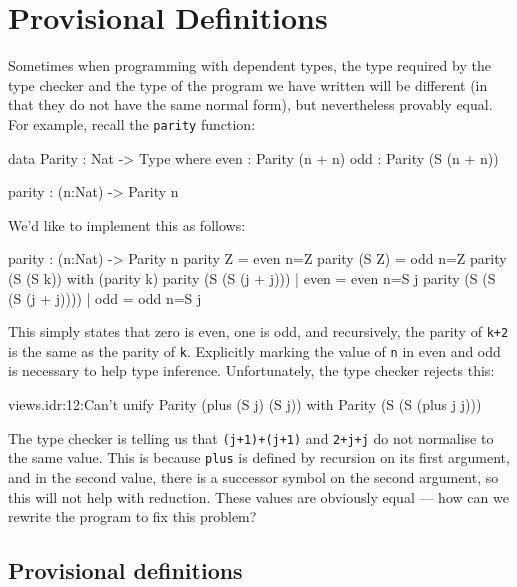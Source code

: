 \section{Provisional Definitions}

\label{sect:provisional}

Sometimes when programming with dependent types, the type required by the type checker and the type of the program we have written will be different (in that they do not have the same normal form), but nevertheless provably equal.
For example, recall the \texttt{parity} function:

\begin{code}
data Parity : Nat -> Type where
   even : Parity (n + n)
   odd  : Parity (S (n + n))

parity : (n:Nat) -> Parity n
\end{code}

\noindent
We'd like to implement this as follows:

\begin{code}
parity : (n:Nat) -> Parity n
parity Z     = even {n=Z}
parity (S Z) = odd {n=Z}
parity (S (S k)) with (parity k)
  parity (S (S (j + j)))     | even = even {n=S j}
  parity (S (S (S (j + j)))) | odd  = odd {n=S j}
\end{code}

\noindent
This simply states that zero is even, one is odd, and recursively, the parity of \texttt{k+2} is the same as the parity of \texttt{k}. 
Explicitly marking the value of \texttt{n} in even and odd is necessary to help type inference.
Unfortunately, the type checker rejects this:

\begin{code}
views.idr:12:Can't unify Parity (plus (S j) (S j)) with 
Parity (S (S (plus j j)))
\end{code}

\noindent
The type checker is telling us that \texttt{(j+1)+(j+1)} and \texttt{2+j+j} do not normalise to the same value.
This is because \texttt{plus} is defined by recursion on its first argument, and in the second value, there is a successor symbol on the second argument, so this will not help with reduction.
These values are obviously equal --- how can we rewrite the program to fix this problem?

\subsection{Provisional definitions}

